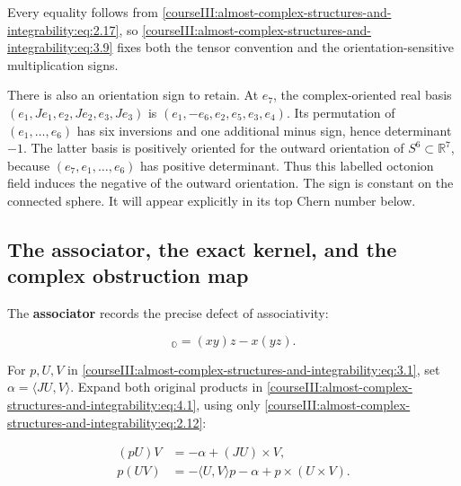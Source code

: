 Every equality follows from \eqref{courseIII:almost-complex-structures-and-integrability:eq:2.17}, so \eqref{courseIII:almost-complex-structures-and-integrability:eq:3.9} fixes both the tensor convention and the orientation-sensitive multiplication signs.

There is also an orientation sign to retain. At \(e_7\), the complex-oriented real basis \((e_1,Je_1,e_2,Je_2,e_3,Je_3)\) is \((e_1,-e_6,e_2,e_5,e_3,e_4)\). Its permutation of \((e_1,\ldots,e_6)\) has six inversions and one additional minus sign, hence determinant \(-1\). The latter basis is positively oriented for the outward orientation of \(S^6\subset\mathbb R^7\), because \((e_7,e_1,\ldots,e_6)\) has positive determinant. Thus this labelled octonion field induces the negative of the outward orientation. The sign is constant on the connected sphere. It will appear explicitly in its top Chern number below.

\subsection{The associator, the exact kernel, and the complex obstruction map}
\label{courseIII:almost-complex-structures-and-integrability:associator-and-kernel}

\label{courseIII:almost-complex-structures-and-integrability:section-4}

The \textbf{associator} records the precise defect of associativity:

\begin{equation}
[x,y,z]_{\mathbb O}=(xy)z-x(yz).
\label{courseIII:almost-complex-structures-and-integrability:eq:4.1}
\end{equation}

For \(p,U,V\) in \eqref{courseIII:almost-complex-structures-and-integrability:eq:3.1}, set \(\alpha=\langle JU,V\rangle\). Expand both original products in \eqref{courseIII:almost-complex-structures-and-integrability:eq:4.1}, using only \eqref{courseIII:almost-complex-structures-and-integrability:eq:2.12}:

\begin{equation}
\begin{aligned}
(pU)V&=-\alpha+(JU)\times V,\\
p(UV)&=-\langle U,V\rangle p-\alpha+p\times(U\times V).
\end{aligned}
\label{courseIII:almost-complex-structures-and-integrability:eq:4.2}
\end{equation}

